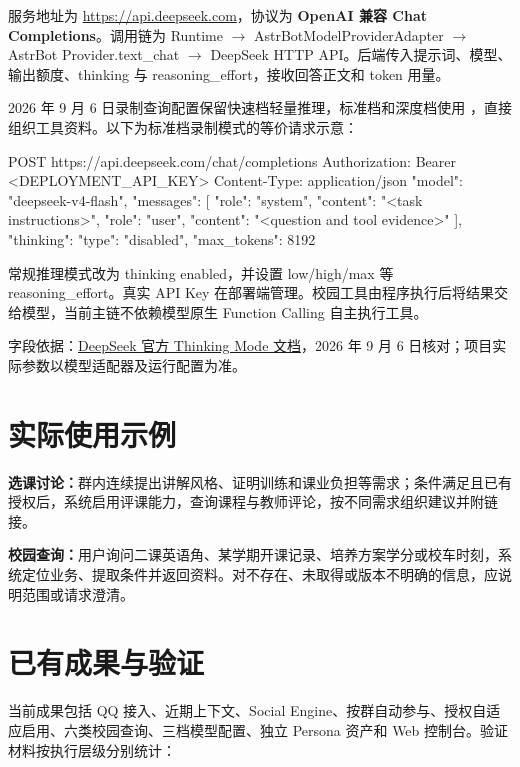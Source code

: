 \documentclass[lang=cn,chinesefont=nofont,11pt,a4paper,bibend=bibtex]{elegantpaper}
\begin{document}
服务地址为 \url{https://api.deepseek.com}，协议为 \textbf{OpenAI 兼容 Chat Completions}。调用链为 Runtime $\rightarrow$ AstrBotModelProviderAdapter $\rightarrow$ AstrBot Provider.text\_chat $\rightarrow$ DeepSeek HTTP API。后端传入提示词、模型、输出额度、thinking 与 reasoning\_effort，接收回答正文和 token 用量。

2026 年 9 月 6 日录制查询配置保留快速档轻量推理，标准档和深度档使用 ，直接组织工具资料。以下为标准档录制模式的等价请求示意：

\begin{Code}
POST https://api.deepseek.com/chat/completions
Authorization: Bearer <DEPLOYMENT_API_KEY>
Content-Type: application/json
{
  "model": "deepseek-v4-flash",
  "messages": [
    {"role": "system", "content": "<task instructions>"},
    {"role": "user", "content": "<question and tool evidence>"}
  ],
  "thinking": {"type": "disabled"},
  "max_tokens": 8192
}
\end{Code}

常规推理模式改为 thinking enabled，并设置 low/high/max 等 reasoning\_effort。真实 API Key 在部署端管理。校园工具由程序执行后将结果交给模型，当前主链不依赖模型原生 Function Calling 自主执行工具。

字段依据：\href{https://api-docs.deepseek.com/guides/thinking_mode/}{DeepSeek 官方 Thinking Mode 文档}，2026 年 9 月 6 日核对；项目实际参数以模型适配器及运行配置为准。

\section{实际使用示例}
\textbf{选课讨论：}群内连续提出讲解风格、证明训练和课业负担等需求；条件满足且已有授权后，系统启用评课能力，查询课程与教师评论，按不同需求组织建议并附链接。

\textbf{校园查询：}用户询问二课英语角、某学期开课记录、培养方案学分或校车时刻，系统定位业务、提取条件并返回资料。对不存在、未取得或版本不明确的信息，应说明范围或请求澄清。

\clearpage
\section{已有成果与验证}
当前成果包括 QQ 接入、近期上下文、Social Engine、按群自动参与、授权自适应启用、六类校园查询、三档模型配置、独立 Persona 资产和 Web 控制台。验证材料按执行层级分别统计：
\end{document}

